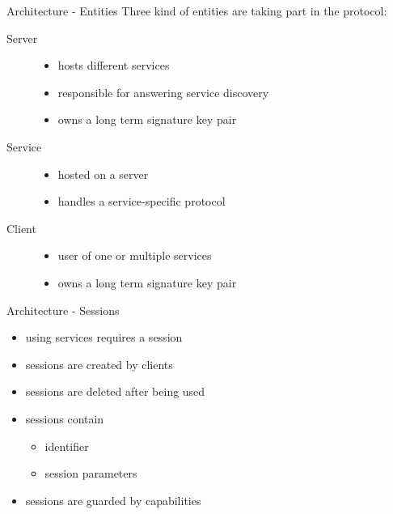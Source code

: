 \documentclass[a4paper]{beamer}
\begin{document}
\begin{frame}{Architecture - Entities}
    Three kind of entities are taking part in the protocol:

    \begin{description}
        \item[Server]
            \begin{itemize}
                \item hosts different services
                \item responsible for answering service discovery
                \item owns a long term signature key pair
            \end{itemize}
        \item[Service]
            \begin{itemize}
                \item hosted on a server
                \item handles a service-specific protocol
            \end{itemize}
        \item[Client]
            \begin{itemize}
                \item user of one or multiple services
                \item owns a long term signature key pair
            \end{itemize}
    \end{description}
\end{frame}

\begin{frame}{Architecture - Sessions}
    \begin{itemize}
        \item using services requires a session
        \item sessions are created by clients
        \item sessions are deleted after being used
        \item sessions contain
            \begin{itemize}
                \item identifier
                \item session parameters
            \end{itemize}
        \item sessions are guarded by capabilities
    \end{itemize}
\end{frame}
\end{document}
